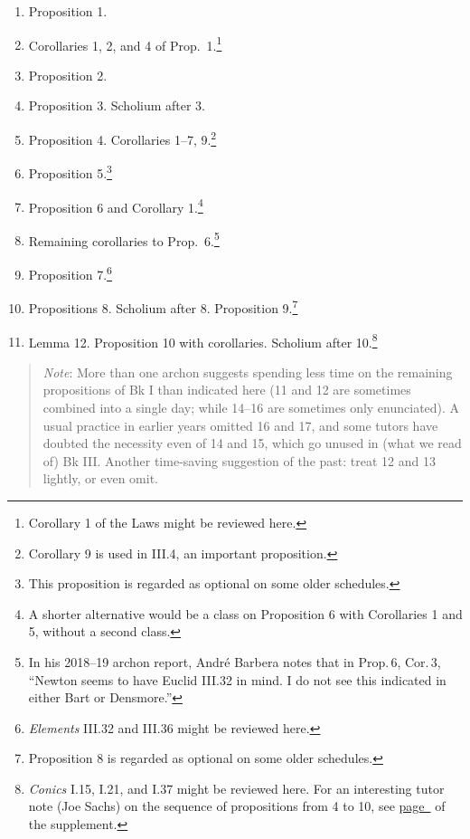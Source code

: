 \documentclass[10pt]{article}
\begin{document}
\begin{enumerate}[resume*] \item Proposition 1.  \item
		Corollaries 1, 2, and 4 of
		Prop.~1.\footnote{Corollary 1 of the Laws
			might be reviewed here.} \item
		Proposition 2.  \item Proposition 3.
		Scholium after 3.  \item Proposition 4.
		Corollaries 1--7, 9.\footnote{Corollary 9 is used in III.4, an important proposition.}  \item Proposition
		5.\footnote{This proposition is regarded as
			optional on some older schedules.}
	\item Proposition 6 and Corollary 1.\footnote{A
			shorter alternative would be
			a class on Proposition 6 with Corollaries 1 and
			5, without a second class.}  \item
		Remaining corollaries to Prop.~6.\footnote{In his 2018--19 archon report, Andr\'e Barbera notes that in Prop.\,6, Cor.\,3, ``Newton seems to have Euclid III.32 in mind. I do not see
		this indicated in either Bart or Densmore.''}
		  \item
		Proposition 7.\footnote{\emph{Elements}
			III.32 and III.36 might be reviewed
			here.} \item Propositions 8.
		Scholium after 8. Proposition
		9.\footnote{Proposition 8 is regarded as
			optional on some older schedules.}
	\item Lemma 12. Proposition 10 with corollaries.
		Scholium after 10.\footnote{\emph{Conics}
			I.15, I.21, and I.37 might be
			reviewed here. For an interesting
			tutor note (Joe Sachs) on the
			sequence of propositions from 4 to
			10, see
			\hyperref[supple.77]{page~\pageref{supple.77}}
			of the supplement.} \end{enumerate}
			\vspace{-0.5em}
\begin{quote} \small{\emph{Note}: More than one archon
		suggests spending less time on the remaining
		propositions of Bk I than indicated here (11
		and 12 are sometimes combined into a single
		day; while 14–16 are sometimes only
		enunciated). A usual practice in earlier
		years omitted 16 and 17, and some tutors
		have doubted the necessity even of 14 and
		15, which go unused in (what we read of) Bk
		III. Another time-saving suggestion of the
		past: treat 12 and 13 lightly, or even
		omit.}  \end{quote}
\end{document}
